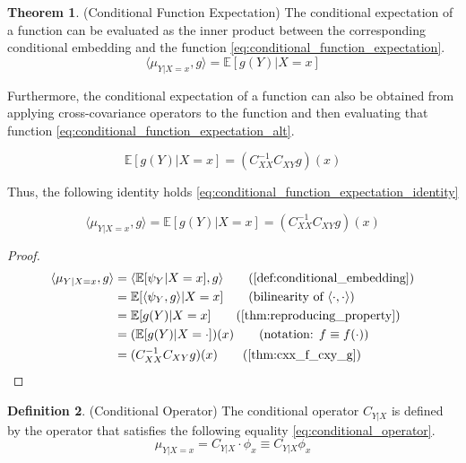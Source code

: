 \documentclass[twoside]{article} \usepackage{aistats2017}
\theoremstyle{definition}
\newtheorem{theorem}{Theorem}[section]
\newtheorem{definition}[theorem]{Definition}
\newcommand{\rv}[1]{{#1}}
\newcommand{\expect}[1]{{\mathbb{E}[#1]}}
\newcommand{\inner}[2]{{\langle #1, #2 \rangle}}
\newcommand{\muYx}{\mu_{\rv{Y} | \rv{X} = x}}
\newcommand{\psiY}{\psi_{\rv{Y}}}
\newcommand{\Cxy}{C_{\rv{X} \rv{Y}}}
\newcommand{\Cxx}{C_{\rv{X} \rv{X}}}
\newcommand{\Cylx}{C_{\rv{Y} | \rv{X}}}
\begin{document}
		\begin{theorem} \label{thm:conditional_function_expectation}
			(Conditional Function Expectation)
			The conditional expectation of a function can be evaluated as the inner product between the corresponding conditional embedding and the function \eqref{eq:conditional_function_expectation}.
			\begin{equation}
				\inner{\muYx}{g} = \expect{g(\rv{Y}) | \rv{X} = x}
			\label{eq:conditional_function_expectation}
			\end{equation}
			
			Furthermore, the conditional expectation of a function can also be obtained from applying cross-covariance operators to the function and then evaluating that function \eqref{eq:conditional_function_expectation_alt}.
			
			\begin{equation}
				\expect{g(\rv{Y}) | \rv{X} = x} = (\Cxx^{-1} \Cxy g)(x)
			\label{eq:conditional_function_expectation_alt}
			\end{equation}
			
			Thus, the following identity holds \eqref{eq:conditional_function_expectation_identity}
			
			\begin{equation}
				\inner{\muYx}{g} = \expect{g(\rv{Y}) | \rv{X} = x} = (\Cxx^{-1} \Cxy g)(x)
			\label{eq:conditional_function_expectation_identity}	
			\end{equation}
	
			\begin{proof}
				\begin{align*}
					\inner{\muYx}{g} &= \inner{\expect{\psiY | \rv{X} = x}}{g} \tag{\cref{def:conditional_embedding}} \\
					&= \expect{\inner{\psiY}{g} | \rv{X} = x} \tag{bilinearity of $\inner{\cdot}{\cdot}$} \\
					&= \expect{g(\rv{Y}) | \rv{X} = x} \tag{\cref{thm:reproducing_property}} \\
					&= (\expect{g(\rv{Y}) | \rv{X} = \cdot})(x) \tag{notation: $f \equiv f(\cdot)$} \\
					&= (\Cxx^{-1} \Cxy g)(x) \tag{\cref{thm:cxx_f_cxy_g}}
				\end{align*}
			\end{proof}
		\end{theorem}
		
		\begin{definition} \label{def:conditional_operator}
			(Conditional Operator)
			The conditional operator $\Cylx$ is defined by the operator that satisfies the following equality \eqref{eq:conditional_operator}.
			\begin{equation}
				\muYx = \Cylx \cdot \phi_{x} \equiv \Cylx \phi_{x}
			\label{eq:conditional_operator}
			\end{equation}
		\end{definition}
	
\end{document}
